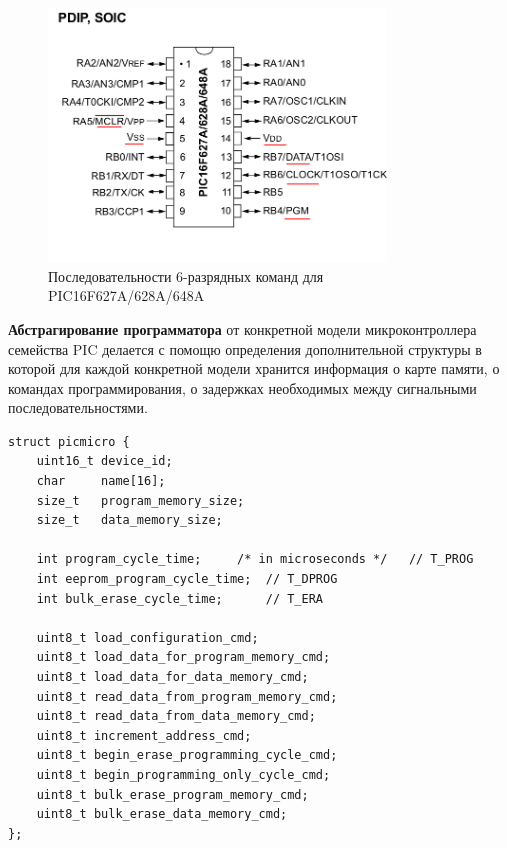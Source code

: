 \begin{figure}[h!]
    \centering
    \includegraphics[width=0.8\textwidth]{2017-05-07_at_22:31:52_screenshot.png}
    \caption{Последовательности 6-разрядных команд для PIC16F627A/628A/648A}
\end{figure}

\textbf{Абстрагирование программатора} от конкретной модели микроконтроллера семейства PIC 
делается с помощю определения дополнительной структуры в которой для каждой конкретной модели 
хранится информация о карте памяти, о командах программирования, о задержках необходимых между 
сигнальными последовательностями.

\begin{small}
\begin{verbatim}
struct picmicro {
    uint16_t device_id;
    char     name[16];
    size_t   program_memory_size;
    size_t   data_memory_size;

    int program_cycle_time;     /* in microseconds */   // T_PROG
    int eeprom_program_cycle_time;  // T_DPROG
    int bulk_erase_cycle_time;      // T_ERA

    uint8_t load_configuration_cmd;
    uint8_t load_data_for_program_memory_cmd;
    uint8_t load_data_for_data_memory_cmd;
    uint8_t read_data_from_program_memory_cmd;
    uint8_t read_data_from_data_memory_cmd;
    uint8_t increment_address_cmd;
    uint8_t begin_erase_programming_cycle_cmd;
    uint8_t begin_programming_only_cycle_cmd;
    uint8_t bulk_erase_program_memory_cmd;
    uint8_t bulk_erase_data_memory_cmd;
};
\end{verbatim}
\end{small}

